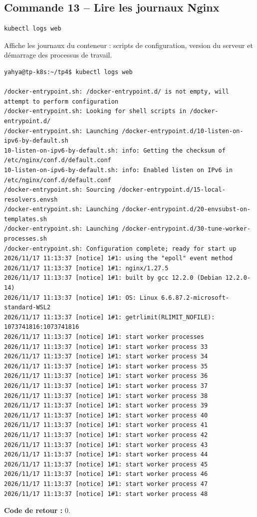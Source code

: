 \documentclass[11pt,a4paper]{article}
\begin{document}
\subsection{Commande 13 -- Lire les journaux Nginx}
\begin{lstlisting}
kubectl logs web
\end{lstlisting}
Affiche les journaux du conteneur : scripts de configuration, version du serveur et démarrage des processus de travail.

\clearpage
\begin{tcolorbox}[terminal,title={Ubuntu / WSL2 -- Commande 13 -- rendu reconstitué}]
\begin{Verbatim}[fontsize=\scriptsize,breaklines=true,breakanywhere=true,breaksymbolleft={},breaksymbolright={}]
yahya@tp-k8s:~/tp4$ kubectl logs web

/docker-entrypoint.sh: /docker-entrypoint.d/ is not empty, will attempt to perform configuration
/docker-entrypoint.sh: Looking for shell scripts in /docker-entrypoint.d/
/docker-entrypoint.sh: Launching /docker-entrypoint.d/10-listen-on-ipv6-by-default.sh
10-listen-on-ipv6-by-default.sh: info: Getting the checksum of /etc/nginx/conf.d/default.conf
10-listen-on-ipv6-by-default.sh: info: Enabled listen on IPv6 in /etc/nginx/conf.d/default.conf
/docker-entrypoint.sh: Sourcing /docker-entrypoint.d/15-local-resolvers.envsh
/docker-entrypoint.sh: Launching /docker-entrypoint.d/20-envsubst-on-templates.sh
/docker-entrypoint.sh: Launching /docker-entrypoint.d/30-tune-worker-processes.sh
/docker-entrypoint.sh: Configuration complete; ready for start up
2026/11/17 11:13:37 [notice] 1#1: using the "epoll" event method
2026/11/17 11:13:37 [notice] 1#1: nginx/1.27.5
2026/11/17 11:13:37 [notice] 1#1: built by gcc 12.2.0 (Debian 12.2.0-14) 
2026/11/17 11:13:37 [notice] 1#1: OS: Linux 6.6.87.2-microsoft-standard-WSL2
2026/11/17 11:13:37 [notice] 1#1: getrlimit(RLIMIT_NOFILE): 1073741816:1073741816
2026/11/17 11:13:37 [notice] 1#1: start worker processes
2026/11/17 11:13:37 [notice] 1#1: start worker process 33
2026/11/17 11:13:37 [notice] 1#1: start worker process 34
2026/11/17 11:13:37 [notice] 1#1: start worker process 35
2026/11/17 11:13:37 [notice] 1#1: start worker process 36
2026/11/17 11:13:37 [notice] 1#1: start worker process 37
2026/11/17 11:13:37 [notice] 1#1: start worker process 38
2026/11/17 11:13:37 [notice] 1#1: start worker process 39
2026/11/17 11:13:37 [notice] 1#1: start worker process 40
2026/11/17 11:13:37 [notice] 1#1: start worker process 41
2026/11/17 11:13:37 [notice] 1#1: start worker process 42
2026/11/17 11:13:37 [notice] 1#1: start worker process 43
2026/11/17 11:13:37 [notice] 1#1: start worker process 44
2026/11/17 11:13:37 [notice] 1#1: start worker process 45
2026/11/17 11:13:37 [notice] 1#1: start worker process 46
2026/11/17 11:13:37 [notice] 1#1: start worker process 47
2026/11/17 11:13:37 [notice] 1#1: start worker process 48
\end{Verbatim}
\end{tcolorbox}
\textbf{Code de retour :} 0.
\end{document}
